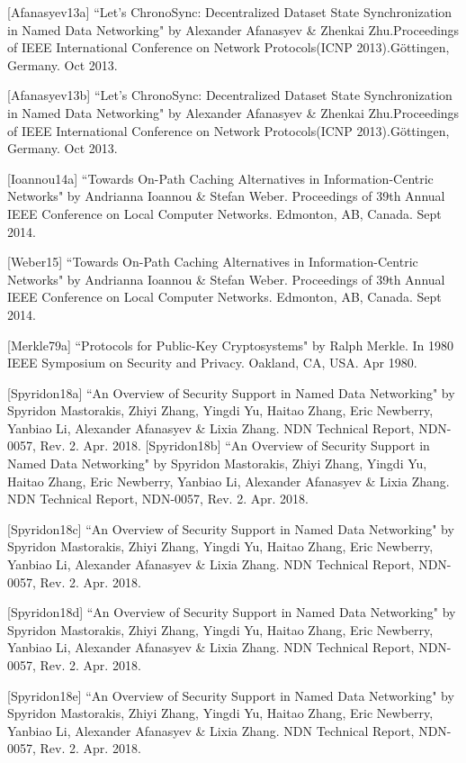 [Afanasyev13a] ``Let's ChronoSync: Decentralized Dataset State
Synchronization in Named Data Networking" by Alexander Afanasyev \& Zhenkai Zhu.Proceedings of  IEEE International Conference on Network Protocols(ICNP 2013).Göttingen, Germany. Oct 2013.


[Afanasyev13b] ``Let's ChronoSync: Decentralized Dataset State
Synchronization in Named Data Networking" by Alexander Afanasyev \& Zhenkai Zhu.Proceedings of  IEEE International Conference on Network Protocols(ICNP 2013).Göttingen, Germany. Oct 2013.


[Ioannou14a] ``Towards On-Path Caching Alternatives in Information-Centric Networks" by Andrianna Ioannou \& Stefan Weber. Proceedings of 39th Annual IEEE Conference on Local Computer Networks. Edmonton, AB, Canada. Sept 2014.


[Weber15] ``Towards On-Path Caching Alternatives in Information-Centric Networks" by Andrianna Ioannou \& Stefan Weber. Proceedings of 39th Annual IEEE Conference on Local Computer Networks. Edmonton, AB, Canada. Sept 2014.


[Merkle79a] ``Protocols for Public-Key Cryptosystems" by Ralph Merkle. In 1980 IEEE Symposium on Security and Privacy. Oakland, CA, USA. Apr 1980.

[Spyridon18a] ``An Overview of Security Support in Named Data Networking" by Spyridon Mastorakis, Zhiyi Zhang, Yingdi Yu, Haitao Zhang, Eric Newberry, Yanbiao Li, Alexander Afanasyev \& Lixia Zhang. NDN Technical Report, NDN-0057, Rev. 2. Apr. 2018.
[Spyridon18b] ``An Overview of Security Support in Named Data Networking" by Spyridon Mastorakis, Zhiyi Zhang, Yingdi Yu, Haitao Zhang, Eric Newberry, Yanbiao Li, Alexander Afanasyev \& Lixia Zhang. NDN Technical Report, NDN-0057, Rev. 2. Apr. 2018.

[Spyridon18c] ``An Overview of Security Support in Named Data Networking" by Spyridon Mastorakis, Zhiyi Zhang, Yingdi Yu, Haitao Zhang, Eric Newberry, Yanbiao Li, Alexander Afanasyev \& Lixia Zhang. NDN Technical Report, NDN-0057, Rev. 2. Apr. 2018.

[Spyridon18d] ``An Overview of Security Support in Named Data Networking" by Spyridon Mastorakis, Zhiyi Zhang, Yingdi Yu, Haitao Zhang, Eric Newberry, Yanbiao Li, Alexander Afanasyev \& Lixia Zhang. NDN Technical Report, NDN-0057, Rev. 2. Apr. 2018.

[Spyridon18e] ``An Overview of Security Support in Named Data Networking" by Spyridon Mastorakis, Zhiyi Zhang, Yingdi Yu, Haitao Zhang, Eric Newberry, Yanbiao Li, Alexander Afanasyev \& Lixia Zhang. NDN Technical Report, NDN-0057, Rev. 2. Apr. 2018.


